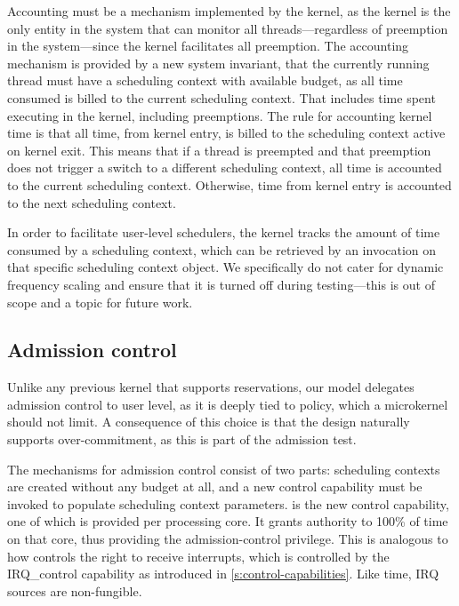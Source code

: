 Accounting must be a mechanism implemented by the kernel, as the kernel is the only entity in the system
that can monitor all threads---regardless of preemption in the system---since the kernel facilitates all
preemption.
The accounting mechanism is provided by a new system invariant, that the currently running thread 
must have a scheduling context with available budget, as all time consumed is billed to the
current scheduling context.
That includes time spent executing in the kernel, including preemptions.
The rule for accounting kernel time is that all time, from kernel entry, is billed to the scheduling
context active on kernel exit. This means that if a thread is preempted and 
that preemption does not trigger a switch to a 
different scheduling context, all time is accounted to the current scheduling context. Otherwise, 
time from kernel entry is accounted to the next scheduling context.

In order to facilitate user-level schedulers, the kernel tracks the amount of time consumed by a
scheduling context, which can be retrieved by an invocation on that specific scheduling context
object.
We specifically do not cater for dynamic frequency scaling and ensure that it is turned off
during testing---this is out of scope and a topic for future work. 

\subsection{Admission control}
\label{sec:model-admission}

Unlike any previous kernel that supports reservations, our model delegates admission control to user
level, as it is deeply tied to policy, which a microkernel should not limit. A consequence of this
choice is that the design naturally supports over-commitment, as this is part of the admission test.

The mechanisms for admission control consist of two parts: scheduling contexts are created without
any budget at all, and a new control capability must be invoked to populate scheduling context
parameters.
\schedcontrol is the new control capability, one of which is provided per processing core.
It grants authority to 100\% of time on that core, thus providing the admission-control privilege.
This is analogous to how \selfour controls the right
to receive interrupts, which is controlled by the IRQ\_control
capability as introduced in \cref{s:control-capabilities}. Like time, IRQ sources are non-fungible.

